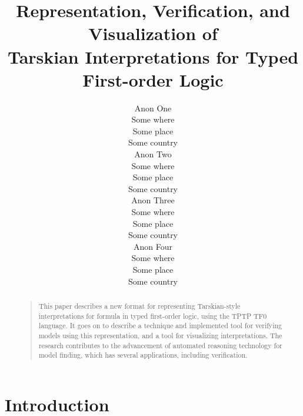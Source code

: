 \documentclass[letterpaper]{article}
\begin{document}

\title{Representation, Verification, and Visualization of\\
Tarskian Interpretations for Typed First-order Logic}
\author{Anon One\\
Some where\\
Some place\\
Some country\\
\And
Anon Two\\
Some where\\
Some place\\
Some country\\
\And
Anon Three\\
Some where\\
Some place\\
Some country\\
\And
Anon Four\\
Some where\\
Some place\\
Some country}

\maketitle
\begin{abstract}
\begin{quote}
This paper describes a new format for representing Tarskian-style interpretations for formula in 
typed first-order logic, using the TPTP TF0 language.
It goes on to describe a technique and implemented tool for verifying models using this
representation, and a tool for visualizing interpretations.
The research contributes to the advancement of automated reasoning technology for model finding, 
which has several applications, including verification.
\end{quote}
\end{abstract}
\section{Introduction}
\label{Introduction}
\end{document}
